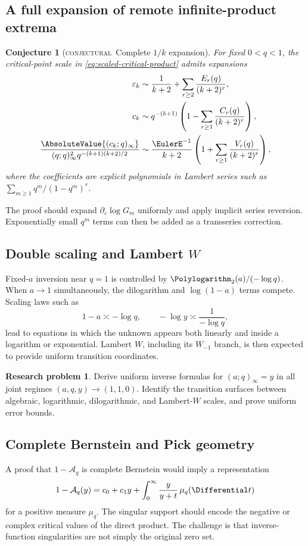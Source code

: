 \documentclass[11pt,oneside]{article}
\newtheorem{conjecture}[theorem]{Conjecture}
\theoremstyle{definition}
\theoremstyle{remark}
\theoremstyle{plain}
\theoremstyle{definition}
\newtheorem{researchproblem}[theorem]{Research problem}
\theoremstyle{remark}
\newcommand{\Aq}{\mathcal A_q}
\newcommand{\statusconjectural}{\textcolor{conjectureorange}{\textsc{conjectural}}}
\numberwithin{equation}{section}
\numberwithin{figure}{section}
\numberwithin{table}{section}
\let\reportsubsection\subsection
\let\reportsubsubsection\subsubsection
\let\section\reportsubsection
\let\subsection\reportsubsubsection
\begin{document}
\section{A full expansion of remote infinite-product extrema}
\begin{conjecture}[\statusconjectural\ Complete \(1/k\) expansion]
For fixed \(0<q<1\), the critical-point scale in
\eqref{eq:scaled-critical-product} admits expansions
\begin{align*}
 \varepsilon_k
 &\sim\frac1{k+2}+\sum_{r\ge2}\frac{E_r(q)}{(k+2)^r},\\
 c_k
 &\sim q^{-(k+1)}\left(1-\sum_{r\ge1}\frac{C_r(q)}{(k+2)^r}\right),\\
 \frac{\AbsoluteValue{(c_k;q)_\infty}}
 {(q;q)_\infty^2q^{-(k+1)(k+2)/2}}
 &\sim\frac{\EulerE^{-1}}{k+2}
 \left(1+\sum_{r\ge1}\frac{V_r(q)}{(k+2)^r}\right),
\end{align*}
where the coefficients are explicit polynomials in Lambert series such as
\(\sum_{m\ge1}q^m/(1-q^m)^r\).
\end{conjecture}
The proof should expand \(\partial_\varepsilon\log G_m\) uniformly and apply
implicit series reversion.  Exponentially small \(q^m\) terms can then be added
as a transseries correction.

\section{Double scaling and Lambert \texorpdfstring{\(W\)}{W}}
Fixed-\(a\) inversion near \(q=1\) is controlled by
\(\Polylogarithm_2(a)/(-\log q)\).  When \(a\to1\) simultaneously, the dilogarithm and
\(\log(1-a)\) terms compete.  Scaling laws such as
\[
 1-a\asymp -\log q,
 \qquad
 -\log y\asymp\frac1{-\log q},
\]
lead to equations in which the unknown appears both linearly and inside a
logarithm or exponential.  Lambert \(W\), including its \(W_{-1}\) branch, is
then expected to provide uniform transition coordinates.

\begin{researchproblem}
Derive uniform inverse formulas for \((a;q)_\infty=y\) in all joint regimes
\((a,q,y)\to(1,1,0)\).  Identify the transition surfaces between algebraic,
logarithmic, dilogarithmic, and Lambert-\(W\) scales, and prove uniform error
bounds.
\end{researchproblem}

\section{Complete Bernstein and Pick geometry}
A proof that \(1-\Aq\) is complete Bernstein would imply a representation
\[
 1-\Aq(y)=c_0+c_1y+
 \int_0^\infty\frac{y}{y+t}\,\mu_q(\Differential t)
\]
for a positive measure \(\mu_q\).  The singular support should encode the
negative or complex critical values of the direct product.  The challenge is
that inverse-function singularities are not simply the original zero set.
\end{document}
